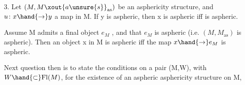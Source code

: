 \hand{\uline{\textcolor{black}{Proposition}}} 3.   Let $(M,M\xout{a\unsure{s}}_{\mathrm{as}})$ be an asphericity structure,  and  $u\colon x \hand{\to} y$
a map in M.  If y is aspheric,  then x is aspheric iff  is aspheric.

\hand{\uline{\textcolor{black}{Corollary}}}  Assume M admits a final object $e_M$ ,  and that $e_M$ is aspheric
(i.e. $(M,M_{\mathrm{as}})$ is aspheric).  Then an object x in M is aspheric iff the
map $x \hand{\to} e_M$ is aspheric.

Next question then is to state the conditions on a pair (M,W), with
$W \hand{\subset} \mathrm{Fl}(M)$,  for the existence of an aspheric asphericity structure on M,
